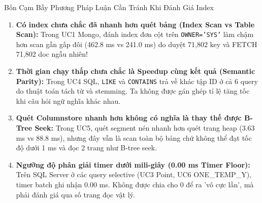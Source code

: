 \documentclass[aspectratio=169,9pt]{beamer}
\begin{document}
\begin{frame}{Bốn Cạm Bẫy Phương Pháp Luận Cần Tránh Khi Đánh Giá Index}
\begin{enumerate}
  \item \textbf{Có index chưa chắc đã nhanh hơn quét bảng (Index Scan vs Table Scan):} Trong UC1 Mongo, đánh index đơn cột trên \texttt{OWNER='SYS'} làm chậm hơn scan gần gấp đôi (462.8 ms vs 241.0 ms) do duyệt 71,802 key và FETCH 71,802 doc ngẫu nhiên!
  \item \textbf{Thời gian chạy thấp chưa chắc là Speedup cùng kết quả (Semantic Parity):} Trong UC4 SQL, \texttt{LIKE} và \texttt{CONTAINS} trả về khác tập ID ở cả 6 query do thuật toán tách từ và stemming. Ta không được gán ghép tỉ lệ tăng tốc khi câu hỏi ngữ nghĩa khác nhau.
  \item \textbf{Quét Columnstore nhanh hơn không có nghĩa là thay thế được B-Tree Seek:} Trong UC5, quét segment nén nhanh hơn quét trang heap ($3.63$ ms vs $88.8$ ms), nhưng đây vẫn là scan toàn bộ bảng chứ không thể đạt tốc độ dưới 1 ms và đọc 2 trang như B-tree seek.
  \item \textbf{Ngưỡng độ phân giải timer dưới mili-giây (0.00 ms Timer Floor):} Trên SQL Server ở các query selective (UC3 Point, UC6 ONE\_TEMP\_Y), timer batch ghi nhận 0.00 ms. Không được chia cho 0 để ra 'vô cực lần', mà phải đánh giá qua số trang đọc vật lý.
\end{enumerate}
\end{frame}
\end{document}

